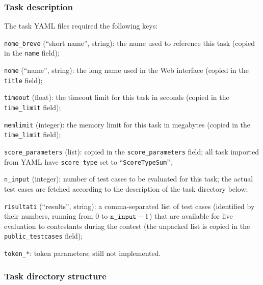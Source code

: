 \documentclass[a4paper,8pt]{amsart}
\newenvironment{squishlist}{%
  \begin{list}{\textbullet}%
    { \setlength{\itemsep}{0pt}%
      \setlength{\parsep}{3pt}%
      \setlength{\topsep}{3pt}%
      \setlength{\partopsep}{0pt}%
      \setlength{\leftmargin}{1.5em}%
      \setlength{\labelwidth}{1em}%
      \setlength{\labelsep}{0.5em} }%
}{\end{list}}
\newcommand{\id}[1]{\texttt{#1}}
\begin{document}
\begin{multicols}{2}
\begin{squishlist}
  \end{squishlist}

  \subsubsection{Task description}

  The task YAML files required the following keys:

  \begin{squishlist}

  \item \id{nome\_breve} (``short name'', string): the name used to
    reference this task (copied in the \id{name} field);

  \item \id{nome} (``name'', string): the long name used in the Web
    interface (copied in the \id{title} field);

  \item \id{timeout} (float): the timeout limit for this task in
    seconds (copied in the \id{time\_limit} field);

  \item \id{memlimit} (integer): the memory limit for this task in
    megabytes (copied in the \id{time\_limit} field);

  \item \id{score\_parameters} (list): copied in the
    \id{score\_parameters} field; all task imported from YAML have
    \id{score\_type} set to ``\id{ScoreTypeSum}'';

  \item \id{n\_input} (integer): number of test cases to be evaluated
    for this task; the actual test cases are fetched according to the
    description of the task directory below;

  \item \id{risultati} (``results'', string): a comma-separated list
    of test cases (identified by their numbers, running from $0$ to
    $\text{\id{n\_input}}-1$) that are available for live evaluation
    to contestants during the contest (the unpacked list is copied in
    the \id{public\_testcases} field);

  \item \id{token\_*}: token parameters; still not implemented. %

  \end{squishlist}

  \subsubsection{Task directory structure}


\end{multicols}
\end{document}
